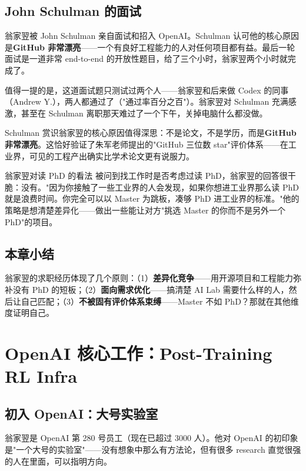 \documentclass[a4paper]{article}
\begin{document}
\subsection{John Schulman 的面试}

翁家翌被 John Schulman 亲自面试和招入 OpenAI。Schulman 认可他的核心原因是\textbf{GitHub 非常漂亮}——一个有良好工程能力的人对任何项目都有益。最后一轮面试是一道非常 end-to-end 的开放性题目，给了三个小时，翁家翌两个小时就完成了。

值得一提的是，这道面试题只测试过两个人——翁家翌和后来做 Codex 的同事（Andrew Y.），两人都通过了（"通过率百分之百"）。翁家翌对 Schulman 充满感激，甚至在 Schulman 离职那天难过了一个下午，关掉电脑什么都没做。

Schulman 赏识翁家翌的核心原因值得深思：不是论文，不是学历，而是\textbf{GitHub 非常漂亮}。这恰好验证了朱军老师提出的"GitHub 三位数 star"评价体系——在工业界，可见的工程产出确实比学术论文更有说服力。

\begin{knowledgebox}{翁家翌对读 PhD 的看法}
被问到找工作时是否考虑过读 PhD，翁家翌的回答很干脆：没有。"因为你接触了一些工业界的人会发现，如果你想进工业界那么读 PhD 就是浪费时间。你完全可以以 Master 为跳板，凑够 PhD 进工业界的标准。"他的策略是想清楚差异化——做出一些能让对方"挑选 Master 的你而不是另外一个 PhD"的项目。
\end{knowledgebox}

\subsection{本章小结}

翁家翌的求职经历体现了几个原则：（1）\textbf{差异化竞争}——用开源项目和工程能力弥补没有 PhD 的短板；（2）\textbf{面向需求优化}——搞清楚 AI Lab 需要什么样的人，然后让自己匹配；（3）\textbf{不被固有评价体系束缚}——Master 不如 PhD？那就在其他维度证明自己。


\section{OpenAI 核心工作：Post-Training RL Infra}

\subsection{初入 OpenAI：大号实验室}

翁家翌是 OpenAI 第 280 号员工（现在已超过 3000 人）。他对 OpenAI 的初印象是"一个大号的实验室"——没有想象中那么有方法论，但有很多 research 直觉很强的人在里面，可以指明方向。
\end{document}
